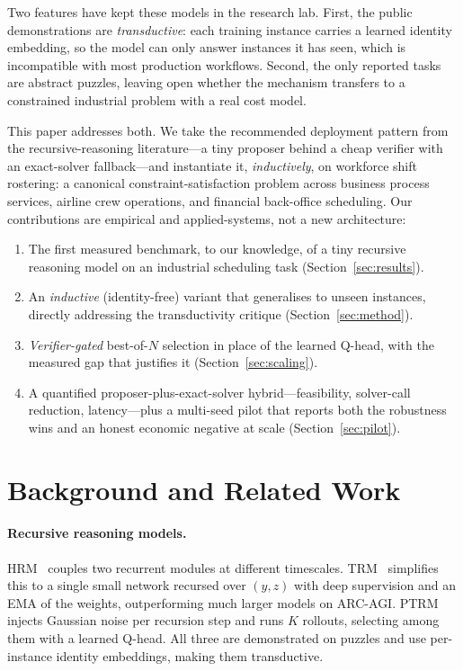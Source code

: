 \documentclass{article}
\begin{document}
Two features have kept these models in the research lab. First, the public
demonstrations are \emph{transductive}: each training instance carries a learned
identity embedding, so the model can only answer instances it has seen, which is
incompatible with most production workflows. Second, the only reported tasks are
abstract puzzles, leaving open whether the mechanism transfers to a constrained
industrial problem with a real cost model.

This paper addresses both. We take the recommended deployment pattern from the
recursive-reasoning literature---a tiny proposer behind a cheap verifier with an
exact-solver fallback---and instantiate it, \emph{inductively}, on workforce
shift rostering: a canonical constraint-satisfaction problem across business
process services, airline crew operations, and financial back-office scheduling.
Our contributions are empirical and applied-systems, not a new architecture:

\begin{enumerate}
\item The first measured benchmark, to our knowledge, of a tiny recursive
reasoning model on an industrial scheduling task (Section~\ref{sec:results}).
\item An \emph{inductive} (identity-free) variant that generalises to unseen
instances, directly addressing the transductivity critique
(Section~\ref{sec:method}).
\item \emph{Verifier-gated} best-of-$N$ selection in place of the learned Q-head,
with the measured gap that justifies it (Section~\ref{sec:scaling}).
\item A quantified proposer-plus-exact-solver hybrid---feasibility, solver-call
reduction, latency---plus a multi-seed pilot that reports both the robustness
wins and an honest economic negative at scale (Section~\ref{sec:pilot}).
\end{enumerate}

\section{Background and Related Work}

\paragraph{Recursive reasoning models.} HRM~\cite{hrm} couples two recurrent
modules at different timescales. TRM~\cite{trm} simplifies this to a single small
network recursed over $(y,z)$ with deep supervision and an EMA of the weights,
outperforming much larger models on ARC-AGI. PTRM~\cite{ptrm} injects Gaussian
noise per recursion step and runs $K$ rollouts, selecting among them with a
learned Q-head. All three are demonstrated on puzzles and use per-instance
identity embeddings, making them transductive.
\end{document}
